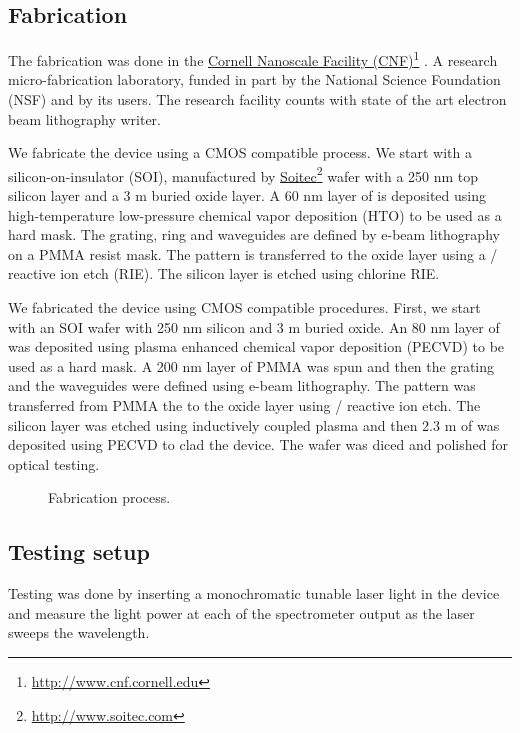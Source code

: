 \documentclass[12pt,twoside,english]{book}
\renewcommand{\~}{\perispomeni}%
\DeclareRobustCommand{\textgreek}[1]{\leavevmode{\greektext #1}}
\numberwithin{equation}{section}
\numberwithin{figure}{section}
\newcommand\fnurl[2]{%
 \href{#2}{#1}\footnote{\url{#2}}%
}
\begin{document}
\subsection{Fabrication}
\label{section:fabrication 1}
The fabrication was done in the \fnurl{Cornell Nanoscale Facility (CNF)}{http://www.cnf.cornell.edu}. A research micro-fabrication laboratory, funded in part by the National Science Foundation (NSF) and by its users. The research facility counts with state of the art electron beam lithography writer.

We fabricate the device using a CMOS compatible process. We start with a silicon-on-insulator (SOI), manufactured by \fnurl{Soitec}{http://www.soitec.com} wafer with a 250 nm top silicon layer and a 3 \textgreek{m}m buried oxide layer. A 60 nm layer of  is deposited using high-temperature low-pressure chemical vapor deposition (HTO) to be used as a hard mask. The grating, ring and waveguides are defined by e-beam lithography on a PMMA resist mask. The pattern is transferred to the oxide layer using a / reactive ion etch (RIE). The silicon layer is etched using chlorine RIE.
 
We fabricated the device using CMOS compatible procedures. First, we start with an SOI wafer with 250 nm silicon and 3 \textgreek{m}m buried oxide. An 80 nm layer of  was deposited using plasma enhanced chemical vapor deposition (PECVD) to be used as a hard mask. A 200 nm layer of PMMA was spun and then the grating and the waveguides were defined using e-beam lithography. The pattern was transferred from PMMA the to the oxide layer using / reactive ion etch. The silicon layer was etched using  inductively coupled plasma and then 2.3 \textgreek{m}m of  was deposited using PECVD to clad the device. The wafer was diced and polished for optical testing.
\begin{figure}[H]
\centering
\caption{Fabrication process.}
\label{fig:fabrication}
\end{figure}

\subsection{Testing setup}
Testing was done by inserting a monochromatic tunable laser light in the device and measure the light power at each of the spectrometer output as the laser sweeps the wavelength.
\end{document}
